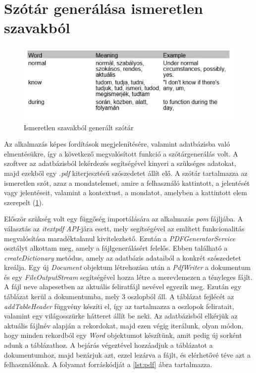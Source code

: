 \section{Szótár generálása ismeretlen szavakból}

\begin{figure}[h!]
  \includegraphics[width=\linewidth]{images/pdf.jpg}
  \caption{Ismeretlen szavakból generált szótár}
  \label{fig:pdf}
\end{figure}

Az alkalmazás képes fordítások megjelenítésére, valamint adatbázisba való elmentésükre, így a következő megvalósított funkció a szótárgenerálás volt. A szoftver az adatbázisból lekérdezés segítségével kinyeri a szükséges adatokat, majd ezekből egy \textit{.pdf} kiterjesztésű szószedetet állít elő. A szótár tartalmazza az ismeretlen szót, azaz a mondatelemet, amire a felhasználó kattintott, a jelentését vagy jelentéseit, valamint a kontextust, a mondatot, amelyben a kattintott elem szerepelt (\ref{fig:pdf}).

Először szükség volt egy függőség importálására az alkalmazás \textit{pom} fájljába. A választás az \textit{itextpdf} \textit{API}-jára esett, mely segítségével az említett funkcionalitás megvalósítása maradéktalanul kivitelezhető. Ezután a \textit{PDFGeneratorService} osztályt alkottam meg, amely a fájlgenerálásért felelős. Ebben található a \textit{createDictionary} metódus, amely az adatbázis adataiból a konkrét szószedetet kreálja. Egy új \textit{Document} objektum létrehozása után a \textit{PdfWriter} a dokumentum és egy \textit{FileOutputStream} segítségével hozza létre a merevlemezen a tényleges fájlt. A fájl neve alapesetben az aktuális feliratfájl nevével egyezik meg. Ezután egy táblázat kerül a dokumentumba, mely 3 oszlopból áll. A táblázat fejlécét az \textit{addTableHeader} függvény készíti el, így az tartalmazza a oszlopok feliratait, valamint egy világosszürke hátteret állít be neki. Az adatbázisból elkérjük az aktuális fájlnév alapján a rekordokat, majd ezen végig iterálunk, olyan módon, hogy minden rekordból egy \textit{Word} objektumot készítünk, amit pedig új sorként adunk a táblázathoz. A bejárás végeztével hozzáadjuk a táblázatot a dokumentumhoz, majd bezárjuk azt, ezzel lezárva a fájlt, és elérhetővé téve azt a felhasználónak. A folyamat forráskódját a \ref{lst:pdf} ábra tartalmazza.

